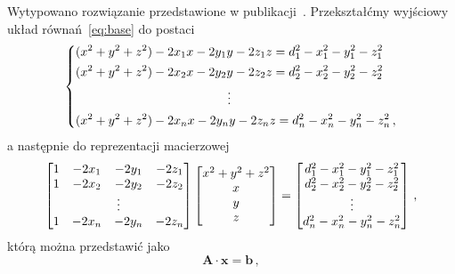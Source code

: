 Wytypowano rozwiązanie przedstawione w publikacji~\cite{norrdine2012algebraic}. Przekształćmy wyjściowy układ równań~\ref{eq:base} do postaci
\begin{equation}
    \begin{dcases}
        (x^2 + y^2 + z^2) - 2x_1x - 2y_1y - 2z_1z = d_1^2 - x_1^2 - y_1^2 - z_1^2 \\
        (x^2 + y^2 + z^2) - 2x_2x - 2y_2y - 2z_2z = d_2^2 - x_2^2 - y_2^2 - z_2^2 \\
        \mspace{220mu}\vdots                                                      \\
        (x^2 + y^2 + z^2) - 2x_n x - 2y_n y - 2z_n z = d_n^2 - x_n^2 - y_n^2 - z_n^2\,,
    \end{dcases}
\end{equation}
a następnie do reprezentacji macierzowej
\begin{equation}
    \left[
        \begin{matrix}
            1 & -2x_1 & -2y_1 & -2z_1  \\
            1 & -2x_2 & -2y_2 & -2z_2  \\
            \multicolumn{4}{c}{\vdots} \\
            1 & -2x_n & -2y_n & -2z_n  \\
        \end{matrix}
        \right]
    \left[
        \begin{matrix}
            x^2 + y^2 + z^2 \\
            x               \\
            y               \\
            z               \\
        \end{matrix}
        \right]
    =
    \left[
        \begin{matrix}
            d_1^2 - x_1^2 - y_1^2 - z_1^2 \\
            d_2^2 - x_2^2 - y_2^2 - z_2^2 \\
            \vdots                        \\
            d_n^2 - x_n^2 - y_n^2 - z_n^2 \\
        \end{matrix}
        \right]\,,
\end{equation}
którą można przedstawić jako
\begin{equation}
    \mathbf{A} \cdot \mathbf{x} = \mathbf{b}\,,
    \label{eq:matrix}
\end{equation}
